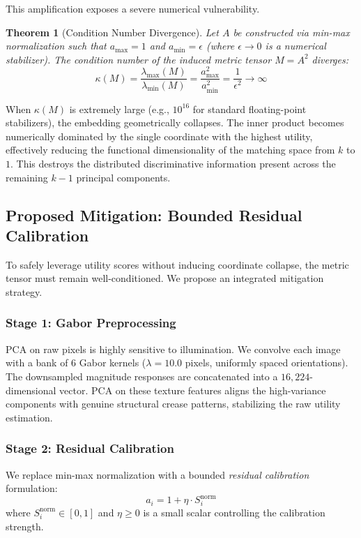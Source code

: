 \documentclass[conference]{IEEEtran}
\newtheorem{theorem}{Theorem}
\begin{document}
This amplification exposes a severe numerical vulnerability.

\begin{theorem}[Condition Number Divergence]
\label{thm:condition}
Let $A$ be constructed via min-max normalization such that $a_{\max} = 1$ and $a_{\min} = \epsilon$ (where $\epsilon \to 0$ is a numerical stabilizer). The condition number of the induced metric tensor $M = A^2$ diverges:
\begin{equation}
    \kappa(M) = \frac{\lambda_{\max}(M)}{\lambda_{\min}(M)} = \frac{a_{\max}^2}{a_{\min}^2} = \frac{1}{\epsilon^2} \to \infty
\end{equation}
\end{theorem}

When $\kappa(M)$ is extremely large (e.g., $10^{16}$ for standard floating-point stabilizers), the embedding geometrically collapses. The inner product becomes numerically dominated by the single coordinate with the highest utility, effectively reducing the functional dimensionality of the matching space from $k$ to $1$. This destroys the distributed discriminative information present across the remaining $k-1$ principal components.

\subsection{Proposed Mitigation: Bounded Residual Calibration}

To safely leverage utility scores without inducing coordinate collapse, the metric tensor must remain well-conditioned. We propose an integrated mitigation strategy.

\subsubsection{Stage 1: Gabor Preprocessing}
PCA on raw pixels is highly sensitive to illumination. We convolve each image with a bank of 6 Gabor kernels ($\lambda = 10.0$ pixels, uniformly spaced orientations). The downsampled magnitude responses are concatenated into a $16{,}224$-dimensional vector. PCA on these texture features aligns the high-variance components with genuine structural crease patterns, stabilizing the raw utility estimation.

\subsubsection{Stage 2: Residual Calibration}
We replace min-max normalization with a bounded \textit{residual calibration} formulation:
\begin{equation}
    a_i = 1 + \eta \cdot S_i^{\text{norm}}
    \label{eq:residual}
\end{equation}
where $S_i^{\text{norm}} \in [0, 1]$ and $\eta \geq 0$ is a small scalar controlling the calibration strength.
\end{document}
